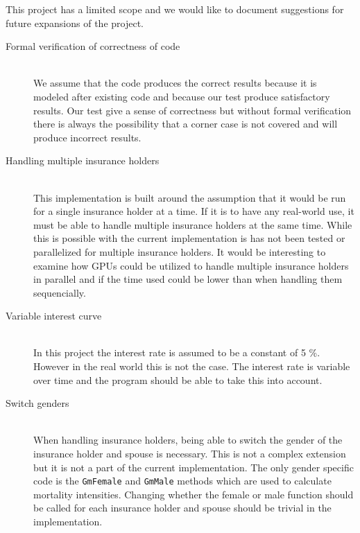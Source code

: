 This project has a limited scope and we would like to document suggestions for future expansions of the project.

\begin{description}
	
\item[Formal verification of correctness of code] \hfill \\
We assume that the code produces the correct results because it is modeled after existing code and because our test produce satisfactory results. Our test give a sense of correctness but without formal verification there is always the possibility that a corner case is not covered and will produce incorrect results. \\

\item[Handling multiple insurance holders] \hfill \\
This implementation is built around the assumption that it would be run for a single insurance holder at a time. If it is to have any real-world use, it must be able to handle multiple insurance holders at the same time. While this is possible with the current implementation is has not been tested or parallelized for multiple insurance holders. It would be interesting to examine how GPUs could be utilized to handle multiple insurance holders in parallel and if the time used could be lower than when handling them sequencially. \\

\item[Variable interest curve] \hfill \\
In this project the interest rate is assumed to be a constant of 5 \%. However in the real world this is not the case. The interest rate is variable over time and the program should be able to take this into account. \\

\item[Switch genders] \hfill \\
When handling insurance holders, being able to switch the gender of the insurance holder and spouse is necessary. This is not a complex extension but it is not a part of the current implementation. The only gender specific code is the \texttt{GmFemale} and \texttt{GmMale} methods which are used to calculate mortality intensities. Changing whether the female or male function should be called for each insurance holder and spouse should be trivial in the implementation. \\


\end{description}
